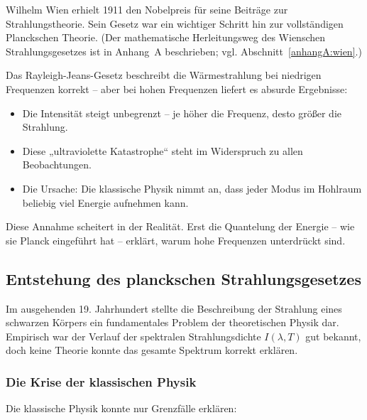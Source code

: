 Wilhelm Wien erhielt 1911 den Nobelpreis für seine Beiträge zur Strahlungstheorie. Sein Gesetz war ein wichtiger Schritt hin zur vollständigen Planckschen Theorie.
(Der mathematische Herleitungsweg des Wienschen Strahlungsgesetzes ist in Anhang~A beschrieben; vgl. Abschnitt~\ref{anhangA:wien}.)
\newpage
\noindent
\vspace{1em}
\begin{tcolorbox}[didaktikbox, title=Warum versagt die klassische Theorie?]
	\label{box:klassik-versagt}
	Das Rayleigh-Jeans-Gesetz beschreibt die Wärmestrahlung bei niedrigen Frequenzen korrekt – aber bei hohen Frequenzen liefert es absurde Ergebnisse:
	
	\begin{itemize}
		\item Die Intensität steigt unbegrenzt – je höher die Frequenz, desto größer die Strahlung.
		\item Diese „ultraviolette Katastrophe“ steht im Widerspruch zu allen Beobachtungen.
		\item Die Ursache: Die klassische Physik nimmt an, dass jeder Modus im Hohlraum beliebig viel Energie aufnehmen kann.
	\end{itemize}
	
	Diese Annahme scheitert in der Realität. Erst die Quantelung der Energie – wie sie Planck eingeführt hat – erklärt, warum hohe Frequenzen unterdrückt sind.
\end{tcolorbox}

\vspace{-1.2em}

\subsection{Entstehung des planckschen Strahlungsgesetzes}

Im ausgehenden 19. Jahrhundert stellte die Beschreibung der Strahlung eines schwarzen Körpers ein fundamentales Problem der theoretischen Physik dar. Empirisch war der Verlauf der spektralen Strahlungsdichte \( I(\lambda, T) \) gut bekannt, doch keine Theorie konnte das gesamte Spektrum korrekt erklären.
\newpage
\noindent
\subsubsection{Die Krise der klassischen Physik}

Die klassische Physik konnte nur Grenzfälle erklären:

